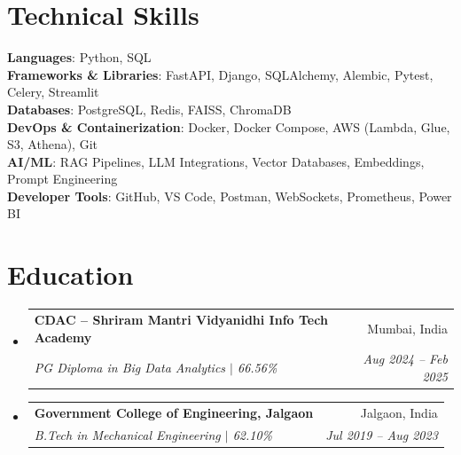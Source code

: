 \documentclass[letterpaper,11pt]{article}
\makeatletter
\newcommand{\resumeSubheading}[4]{
  \vspace{-2pt}\item
    \begin{tabular*}{0.97\textwidth}[t]{l@{\extracolsep{\fill}}r}
      \textbf{#1} & #2 \\
      \textit{\small#3} & \textit{\small #4} \\
    \end{tabular*}\vspace{-7pt}
}
\newcommand{\resumeSubHeadingListStart}{\begin{itemize}[leftmargin=0.15in, label={}]}
\newcommand{\resumeSubHeadingListEnd}{\end{itemize}}
\makeatother
\begin{document}
\section{Technical Skills}
 \begin{itemize}[leftmargin=0.15in, label={}]
    \small{\item{
     \textbf{Languages}{: Python, SQL} \\
     \textbf{Frameworks \& Libraries}{: FastAPI, Django, SQLAlchemy, Alembic, Pytest, Celery, Streamlit} \\
     \textbf{Databases}{: PostgreSQL, Redis, FAISS, ChromaDB} \\
     \textbf{DevOps \& Containerization}{: Docker, Docker Compose, AWS (Lambda, Glue, S3, Athena), Git} \\
     \textbf{AI/ML}{: RAG Pipelines, LLM Integrations, Vector Databases, Embeddings, Prompt Engineering} \\
     \textbf{Developer Tools}{: GitHub, VS Code, Postman, WebSockets, Prometheus, Power BI}
    }}
 \end{itemize}

\section{Education}
  \resumeSubHeadingListStart
    \resumeSubheading
      {CDAC -- Shriram Mantri Vidyanidhi Info Tech Academy}{Mumbai, India}
      {PG Diploma in Big Data Analytics $|$ 66.56\%}{Aug 2024 -- Feb 2025}
    \resumeSubheading
      {Government College of Engineering, Jalgaon}{Jalgaon, India}
      {B.Tech in Mechanical Engineering $|$ 62.10\%}{Jul 2019 -- Aug 2023}
  \resumeSubHeadingListEnd

\end{document}
